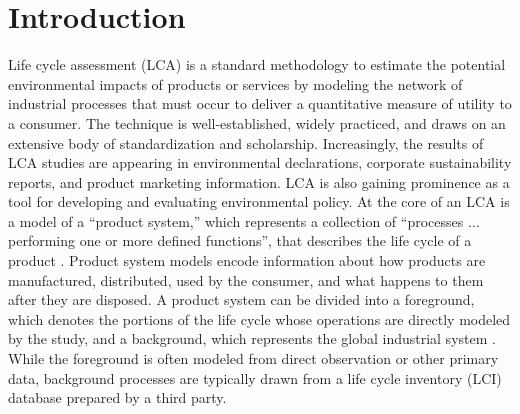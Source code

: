 \section{Introduction}

Life cycle assessment (LCA) is a standard methodology to estimate the potential environmental impacts of products or services by modeling the network of industrial processes that must occur to deliver a quantitative measure of utility to a consumer.  The technique is well-established, widely practiced, and draws on an extensive body of standardization and scholarship.
Increasingly, the results of LCA studies are appearing in environmental declarations, corporate sustainability reports, and product marketing information.  LCA is also gaining prominence as a tool for developing and evaluating environmental policy.  
%
At the core of an LCA is a model of a ``product system,'' which represents a collection of ``processes $\ldots$ performing one or more defined functions'', that describes the life cycle of a product \citep{iso14044}.  Product system models encode information about how products are manufactured, distributed, used by the consumer, and what happens to them after they are disposed.  A product system can be divided into a foreground, which denotes the portions of the life cycle whose operations are directly modeled by the study, and a background, which represents the global industrial system \citep{SETAC_inventory_1998}.  While the foreground is often modeled from direct observation or other primary data, background processes are typically drawn from a life cycle inventory (LCI) database prepared by a third party.

